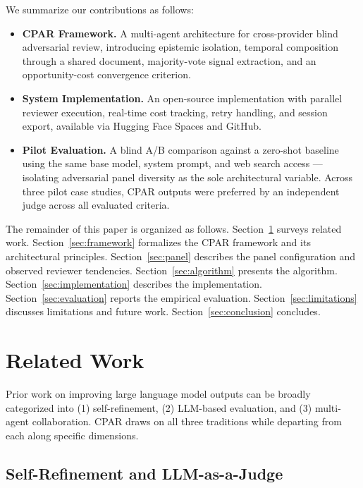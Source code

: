 \documentclass[11pt, a4paper]{article}
\begin{document}
We summarize our contributions as follows:
\begin{itemize}
    \item \textbf{CPAR Framework.} A multi-agent architecture for cross-provider blind adversarial review, introducing epistemic isolation, temporal composition through a shared document, majority-vote signal extraction, and an opportunity-cost convergence criterion.
    \item \textbf{System Implementation.} An open-source implementation with parallel reviewer execution, real-time cost tracking, retry handling, and session export, available via Hugging Face Spaces and GitHub.
    \item \textbf{Pilot Evaluation.} A blind A/B comparison against a zero-shot baseline using the same base model, system prompt, and web search access --- isolating adversarial panel diversity as the sole architectural variable. Across three pilot case studies, CPAR outputs were preferred by an independent judge across all evaluated criteria.
\end{itemize}

The remainder of this paper is organized as follows. Section~\ref{sec:related_work} surveys related work. Section~\ref{sec:framework} formalizes the CPAR framework and its architectural principles. Section~\ref{sec:panel} describes the panel configuration and observed reviewer tendencies. Section~\ref{sec:algorithm} presents the algorithm. Section~\ref{sec:implementation} describes the implementation. Section~\ref{sec:evaluation} reports the empirical evaluation. Section~\ref{sec:limitations} discusses limitations and future work. Section~\ref{sec:conclusion} concludes.

\section{Related Work}
\label{sec:related_work}

Prior work on improving large language model outputs can be broadly categorized into (1) self-refinement, (2) LLM-based evaluation, and (3) multi-agent collaboration. CPAR draws on all three traditions while departing from each along specific dimensions.

\subsection{Self-Refinement and LLM-as-a-Judge}
\end{document}
